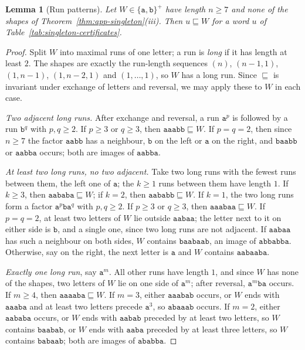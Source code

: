 \documentclass[11pt]{article}
\numberwithin{equation}{section}
\theoremstyle{plain}
\newtheorem{lemma}[theorem]{Lemma}
\theoremstyle{definition}
\theoremstyle{remark}
\theoremstyle{plain}
\begin{document}
\begin{lemma}[Run patterns]
\label{lem:app-singleton-runs}
Let $W\in\{\mathtt a,\mathtt b\}^+$ have length $n\ge7$ and none of the shapes of
Theorem~\ref{thm:app-singleton}\textup{(iii)}.  Then $u\sqsubseteq W$ for a word $u$
of Table~\ref{tab:singleton-certificates}.
\end{lemma}

\begin{proof}
Split $W$ into maximal runs of one letter; a run is \emph{long} if it has length at
least $2$.  The shapes are exactly the run-length sequences $(n)$, $(n-1,1)$,
$(1,n-1)$, $(1,n-2,1)$ and $(1,\ldots,1)$, so $W$ has a long run.  Since
$\sqsubseteq$ is invariant under exchange of letters and reversal, we may apply
these to $W$ in each case.

\emph{Two adjacent long runs.}  After exchange and reversal, a run $\mathtt a^p$ is
followed by a run $\mathtt b^q$ with $p,q\ge2$.  If $p\ge3$ or $q\ge3$, then
$\mathtt{aaabb}\sqsubseteq W$.  If $p=q=2$, then since $n\ge7$ the factor
$\mathtt{aabb}$ has a neighbour, $\mathtt b$ on the left or $\mathtt a$ on the right,
and $\mathtt{baabb}$ or $\mathtt{aabba}$ occurs; both are images of $\mathtt{aabba}$.

\emph{At least two long runs, no two adjacent.}  Take two long runs with the
fewest runs between them, the left one of $\mathtt a$; the $k\ge1$ runs between them
have length $1$.  If $k\ge3$,
then $\mathtt{aababa}\sqsubseteq W$; if $k=2$, then $\mathtt{aababb}\sqsubseteq W$.
If $k=1$, the two long runs form a factor
$\mathtt a^p\mathtt b\mathtt a^q$ with $p,q\ge2$.  If $p\ge3$ or $q\ge3$, then
$\mathtt{aaabaa}\sqsubseteq W$.  If $p=q=2$, at least two letters of $W$ lie
outside $\mathtt{aabaa}$; the letter next to it on either side is $\mathtt b$, and a
single one, since two long runs are not adjacent.  If $\mathtt{aabaa}$ has such a
neighbour on both sides, $W$ contains $\mathtt{baabaab}$, an image of
$\mathtt{abbabba}$.  Otherwise, say on the right, the next letter is $\mathtt a$ and
$W$ contains $\mathtt{aabaaba}$.

\emph{Exactly one long run}, say $\mathtt a^m$.  All other runs have length $1$, and since
$W$ has none of the shapes, two letters of $W$ lie on one side of $\mathtt a^m$; after
reversal, $\mathtt a^m\mathtt{ba}$ occurs.  If $m\ge4$, then
$\mathtt{aaaaba}\sqsubseteq W$.  If $m=3$, either $\mathtt{aaabab}$ occurs, or $W$
ends with $\mathtt{aaaba}$ and at least two letters precede $\mathtt a^3$, so
$\mathtt{abaaab}$ occurs.  If $m=2$, either $\mathtt{aababa}$ occurs, or $W$ ends
with $\mathtt{aabab}$ preceded by at least two letters, so $W$ contains
$\mathtt{baabab}$, or $W$ ends with $\mathtt{aaba}$ preceded by at least three
letters, so $W$ contains $\mathtt{babaab}$; both are images of
$\mathtt{ababba}$.
\end{proof}
\end{document}
